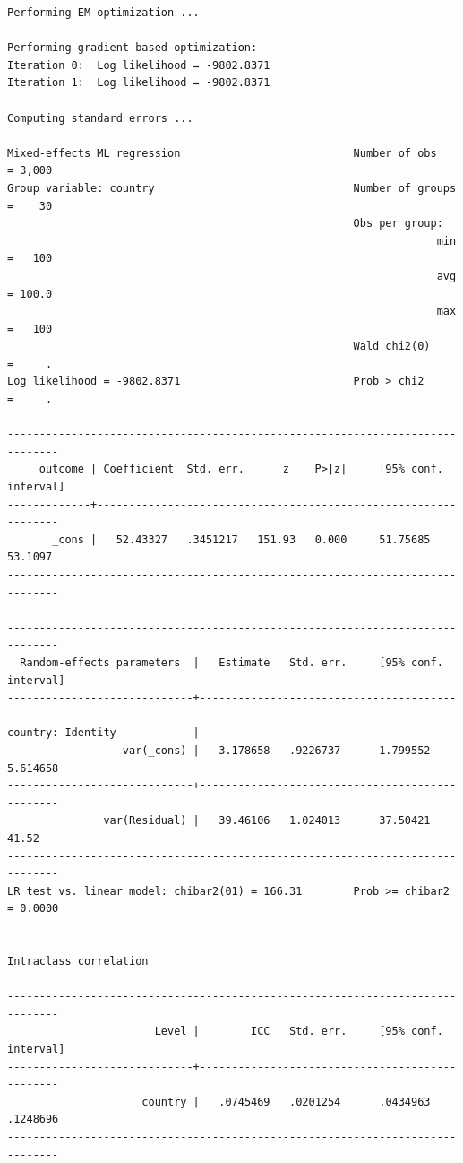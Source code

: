 \documentclass[
  letterpaper,
  DIV=11,
  numbers=noendperiod]{scrreprt}
\begin{document}
\begin{verbatim}
Performing EM optimization ...

Performing gradient-based optimization: 
Iteration 0:  Log likelihood = -9802.8371  
Iteration 1:  Log likelihood = -9802.8371  

Computing standard errors ...

Mixed-effects ML regression                           Number of obs    = 3,000
Group variable: country                               Number of groups =    30
                                                      Obs per group:
                                                                   min =   100
                                                                   avg = 100.0
                                                                   max =   100
                                                      Wald chi2(0)     =     .
Log likelihood = -9802.8371                           Prob > chi2      =     .

------------------------------------------------------------------------------
     outcome | Coefficient  Std. err.      z    P>|z|     [95% conf. interval]
-------------+----------------------------------------------------------------
       _cons |   52.43327   .3451217   151.93   0.000     51.75685     53.1097
------------------------------------------------------------------------------

------------------------------------------------------------------------------
  Random-effects parameters  |   Estimate   Std. err.     [95% conf. interval]
-----------------------------+------------------------------------------------
country: Identity            |
                  var(_cons) |   3.178658   .9226737      1.799552    5.614658
-----------------------------+------------------------------------------------
               var(Residual) |   39.46106   1.024013      37.50421       41.52
------------------------------------------------------------------------------
LR test vs. linear model: chibar2(01) = 166.31        Prob >= chibar2 = 0.0000


Intraclass correlation

------------------------------------------------------------------------------
                       Level |        ICC   Std. err.     [95% conf. interval]
-----------------------------+------------------------------------------------
                     country |   .0745469   .0201254      .0434963    .1248696
------------------------------------------------------------------------------
\end{verbatim}
\end{document}
